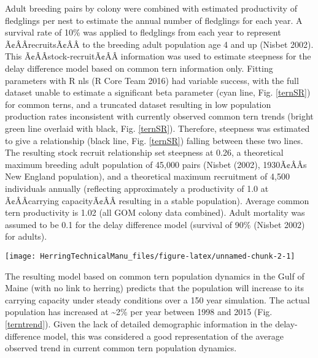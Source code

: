 \documentclass[]{article}
\let\origfigure\figure
\let\endorigfigure\endfigure
\renewenvironment{figure}[1][2] {
    \expandafter\origfigure\expandafter[H]
} {
    \endorigfigure
}
\begin{document}
Adult breeding pairs by colony were combined with estimated productivity
of fledglings per nest to estimate the annual number of fledglings for
each year. A survival rate of 10\% was applied to fledglings from each
year to represent Ã¢ÂÂrecruitsÃ¢ÂÂ to the breeding adult population
age 4 and up (Nisbet 2002). This Ã¢ÂÂstock-recruitÃ¢ÂÂ information
was used to estimate steepness for the delay difference model based on
common tern information only. Fitting parameters with R nls (R Core Team
2016) had variable success, with the full dataset unable to estimate a
significant beta parameter (cyan line, Fig. \ref{ternSR}) for common
terns, and a truncated dataset resulting in low population production
rates inconsistent with currently observed common tern trends (bright
green line overlaid with black, Fig. \ref{ternSR}). Therefore, steepness
was estimated to give a relationship (black line, Fig. \ref{ternSR})
falling between these two lines. The resulting stock recruit
relationship set steepness at 0.26, a theoretical maximum breeding adult
population of 45,000 pairs (Nisbet (2002), 1930Ã¢ÂÂs New England
population), and a theoretical maximum recruitment of 4,500 individuals
annually (reflecting approximately a productivity of 1.0 at
Ã¢ÂÂcarrying capacityÃ¢ÂÂ resulting in a stable population). Average
common tern productivity is 1.02 (all GOM colony data combined). Adult
mortality was assumed to be 0.1 for the delay difference model (survival
of 90\% (Nisbet 2002) for adults).

\begin{figure}

{\centering \texttt{[image: HerringTechnicalManu\_files/figure-latex/unnamed-chunk-2-1]} 

}

\caption{Stock-recruitment function for Gulf of Maine common terns \label{ternSR}}\label{fig:unnamed-chunk-2}
\end{figure}

The resulting model based on common tern population dynamics in the Gulf
of Maine (with no link to herring) predicts that the population will
increase to its carrying capacity under steady conditions over a 150
year simulation. The actual population has increased at
\textasciitilde{}2\% per year between 1998 and 2015 (Fig.
\ref{terntrend}). Given the lack of detailed demographic information in
the delay-difference model, this was considered a good representation of
the average observed trend in current common tern population dynamics.
\end{document}
